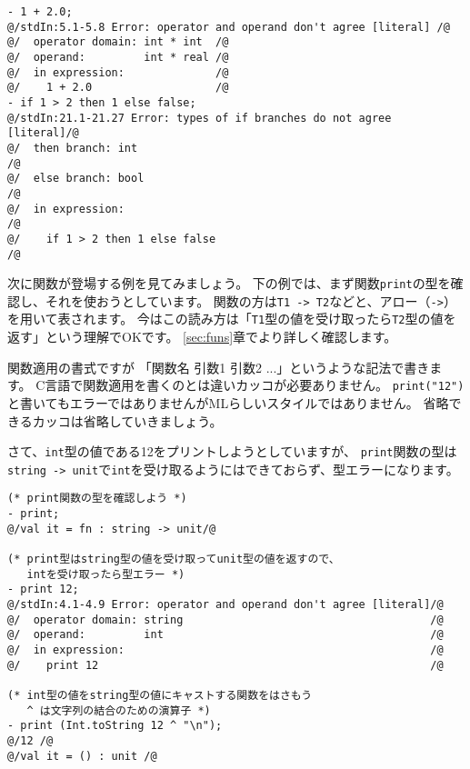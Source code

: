 \documentclass[11pt,a4paper]{article}
\begin{document}
\begin{lstlisting}[label=code:type-error1,caption=型エラー１]
- 1 + 2.0;
@/stdIn:5.1-5.8 Error: operator and operand don't agree [literal] /@
@/  operator domain: int * int  /@
@/  operand:         int * real /@
@/  in expression:              /@
@/    1 + 2.0                   /@
- if 1 > 2 then 1 else false;
@/stdIn:21.1-21.27 Error: types of if branches do not agree [literal]/@
@/  then branch: int                                                 /@
@/  else branch: bool                                                /@
@/  in expression:                                                   /@
@/    if 1 > 2 then 1 else false                                     /@
\end{lstlisting}

次に関数が登場する例を見てみましょう。
下の例では、まず関数\lstinline{print}の型を確認し、それを使おうとしています。
関数の方は\lstinline{T1 -> T2}などと、アロー（\lstinline{->}）を用いて表されます。
今はこの読み方は「\lstinline{T1}型の値を受け取ったら\lstinline{T2}型の値を返す」という理解でOKです。
\ref{sec:funs}章でより詳しく確認します。

関数適用の書式ですが 「関数名 引数1 引数2 ...」というような記法で書きます。
C言語で関数適用を書くのとは違いカッコが必要ありません。
\lstinline{print("12")}と書いてもエラーではありませんがMLらしいスタイルではありません。
省略できるカッコは省略していきましょう。

さて、\lstinline{int}型の値である12をプリントしようとしていますが、
\lstinline{print}関数の型は\lstinline{string -> unit}で\lstinline{int}を受け取るようにはできておらず、型エラーになります。

\begin{lstlisting}[caption=型エラー２,label=code:type-error2]
(* print関数の型を確認しよう *)
- print;
@/val it = fn : string -> unit/@

(* print型はstring型の値を受け取ってunit型の値を返すので、
   intを受け取ったら型エラー *)
- print 12;
@/stdIn:4.1-4.9 Error: operator and operand don't agree [literal]/@
@/  operator domain: string                                      /@
@/  operand:         int                                         /@
@/  in expression:                                               /@
@/    print 12                                                   /@

(* int型の値をstring型の値にキャストする関数をはさもう
   ^ は文字列の結合のための演算子 *)
- print (Int.toString 12 ^ "\n");
@/12 /@
@/val it = () : unit /@
\end{lstlisting}
\end{document}
